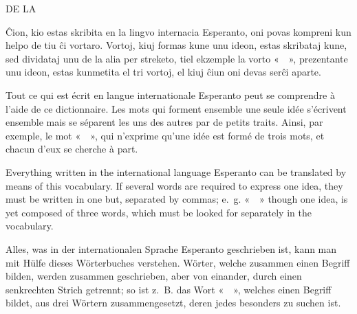 %
%
\label{vortaro}
\thispagestyle{plain}
\vspace*{\fill}
\begin{center}

{}
\vspace{1em}

{\small DE LA}
\vspace{1em}

\vspace{2em}

{\fontsize{30}{36}\selectfont{}}
\end{center}
\vspace*{\fill}
\newpage

\footnotesize

Ĉion, kio estas skribita en la lingvo internacia Esperanto, oni povas kompreni kun helpo de tiu ĉi vortaro. Vortoj, kiuj formas kune unu ideon, estas skribataj kune, sed dividataj unu de la alia per streketo, tiel ekzemple la vorto «~~», prezentante unu ideon, estas kunmetita el tri vortoj, el kiuj ĉiun oni devas serĉi aparte.

\flatsmallrule{}

Tout ce qui est écrit en langue internationale Esperanto peut se comprendre à l’aide de ce dictionnaire. Les mots qui forment ensemble une seule idée s’écrivent ensemble mais se séparent les uns des autres par de petits traits. Ainsi, par exemple, le mot «~~», qui n’exprime qu’une idée est formé de trois mots, et chacun d’eux se cherche à part.

\flatsmallrule{}

Everything written in the international language Esperanto can be translated by means of this vocabulary. If several words are required to express one idea, they must be written in one but, separated by commas; e.~g. «~~» though one idea, is yet composed of three words, which must be looked for separately in the vocabulary.

\flatsmallrule{}

Alles, was in der internationalen Sprache Esperanto geschrieben ist, kann man mit Hülfe dieses Wörterbuches verstehen. Wörter, welche zusammen einen Begriff bilden, werden zusammen geschrieben, aber von einander, durch einen senkrechten Strich getrennt; so ist z.~B. das Wort «~~», welches einen Begriff bildet, aus drei Wörtern zusammengesetzt, deren jedes besonders zu suchen ist.

